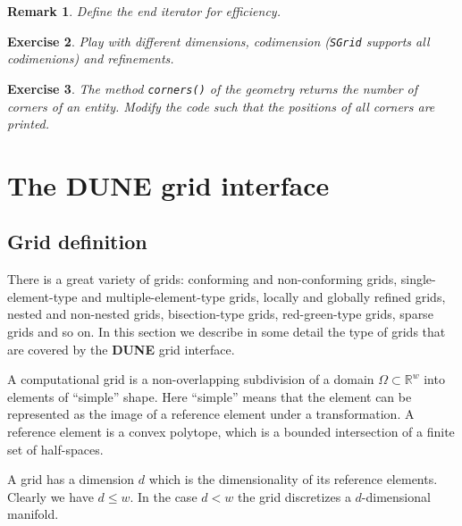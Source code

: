 \documentclass[11pt,a4paper,headinclude,footinclude,DIV16,normalheadings]{scrreprt}
\newcommand{\R}{\mathbb{R}}
\newcommand{\Dune}{{\sf\bfseries DUNE}\xspace}
\newtheorem{exc}{Exercise}[chapter]
\newtheorem{rem}[exc]{Remark}
\begin{document}
\begin{rem} Define the end iterator for efficiency. 
\end{rem}

\begin{exc} Play with different dimensions, codimension
  (\lstinline!SGrid! supports all codimenions) and refinements.
\end{exc}

\begin{exc} The method \lstinline!corners()! of the geometry returns
  the number of corners of an entity. Modify the code such that the
  positions of all corners are printed.
\end{exc}


\chapter{The \texorpdfstring{\Dune{}}{DUNE} grid interface}


\section{Grid definition}

There is a great variety of grids: conforming and non-conforming
grids, single-element-type and multiple-element-type grids, locally
and globally refined grids, nested and non-nested grids,
bisection-type grids, red-green-type grids, sparse grids and so on. In
this section we describe in some detail the type of grids that are
covered by the \Dune{} grid interface.


A computational grid is a non-overlapping subdivision of a domain
$\Omega\subset\R^w$ into elements of ``simple'' shape. Here ``simple''
means that the element can be represented as the image of a reference
element under a transformation. A reference element is a convex
polytope, which is a bounded intersection of a finite set of
half-spaces. 


A grid has a dimension $d$ which is the dimensionality of
its reference elements. Clearly we have $d\leq w$. In the case $d<w$ the grid
discretizes a $d$-dimensional manifold. 
\end{document}
